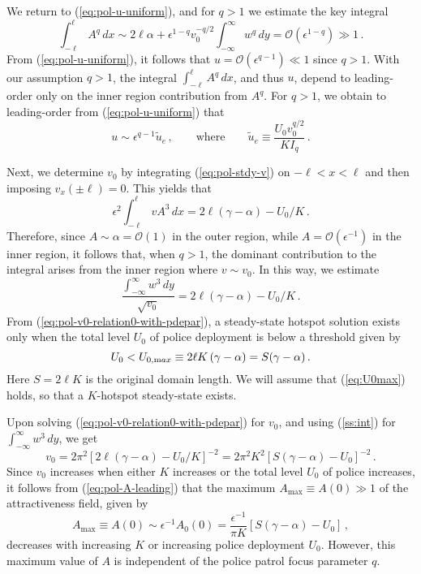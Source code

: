 \documentclass{article}%
\begin{document}
We return to (\ref{eq:pol-u-uniform}), and for $q>1$ we estimate the key 
integral
\[
\int_{-\ell}^{\ell}A^{q}\, dx\sim 2\ell\alpha+\epsilon^{1-q}v_{0}^{-q/2}
\int_{-\infty}^{\infty}w^{q} \, dy= {\mathcal O}(\epsilon^{1-q}) \gg 1 \,.
\]
From (\ref{eq:pol-u-uniform}), it follows that $u={\mathcal
  O}(\epsilon^{q-1})\ll 1$ since $q>1$.  With our assumption 
$q>1$, the integral $\int_{-\ell}^{\ell}A^{q}\, dx$, and thus $u$, depend
to leading-order only on the inner region contribution from
$A^{q}$. For $q>1$, we obtain to leading-order 
from (\ref{eq:pol-u-uniform}) that 
\begin{equation}
  u\sim\epsilon^{q-1}\tilde{u}_{e}\,, \qquad 
\mbox{where} \qquad \tilde{u}_{e} \equiv
\frac{U_{0} v_{0}^{q/2}}{K I_{q}}\,.\label{eq:pol-u-leading}
\end{equation}

Next, we determine $v_{0}$ by integrating (\ref{eq:pol-stdy-v})
on $-\ell<x<\ell$ and then imposing $v_{x}(\pm\ell)=0$. This yields that
\[
\epsilon^{2}\int_{-\ell}^{\ell}vA^{3}\,dx=
2\ell\left(\gamma-\alpha\right)-U_{0}/K\,.
\]
Therefore, since $A\sim\alpha={\mathcal O}(1)$ in the outer region,
while $A={\mathcal O}(\epsilon^{-1})$ in the inner region, it follows
that, when $q>1$, the dominant contribution to the integral arises from
the inner region where $v\sim v_0$. In this way, we estimate
\begin{equation}
\frac{\int_{-\infty}^{\infty}w^{3}\, dy}{\sqrt{v_0}}  =  
2\ell\left(\gamma-\alpha\right)-
U_{0}/K \,. \label{eq:pol-v0-relation0-with-pdepar} 
\end{equation}
From (\ref{eq:pol-v0-relation0-with-pdepar}), a
steady-state hotspot solution exists only when the total level $U_0$ of
police deployment is below a threshold given by
\begin{equation}
U_{0}<U_{0,{\textrm max}}\equiv2\ell K\left(\gamma-\alpha\right) = 
S  (\gamma-\alpha) \,.
\label{eq:U0max}
\end{equation}
Here $S=2\ell K$ is the original domain length. We will
assume that (\ref{eq:U0max}) holds, so that a $K$-hotspot steady-state
exists. 

Upon solving (\ref{eq:pol-v0-relation0-with-pdepar}) for $v_0$, and
using (\ref{ss:int}) for $\int_{-\infty}^{\infty} w^3\, dy$, we get
\begin{equation}
 v_{0}  =  2\pi^{2}\left[2\ell\left(\gamma-\alpha\right)-U_{0}/K\right]^{-2}
  = 2\pi^2 K^2 \left[S(\gamma-\alpha)-U_{0}\right]^{-2}\,.
\label{eq:pol-v0-formula}
\end{equation}
Since $v_0$ increases when either $K$ increases or the total level
$U_0$ of police increases, it follows from (\ref{eq:pol-A-leading})
that the maximum $A_{\max}\equiv A(0)\gg 1$ of the attractiveness field, given by
\begin{equation}\label{eq:amax}
    A_{\max}\equiv A(0) \sim \epsilon^{-1} A_{0}(0) = \frac{\epsilon^{-1}}{\pi K} 
   \left[S(\gamma-\alpha)-U_0\right] \,,
\end{equation}
decreases with increasing $K$ or increasing police deployment
$U_0$. However, this maximum value of $A$ is independent of the police
patrol focus parameter $q$.
\end{document}
